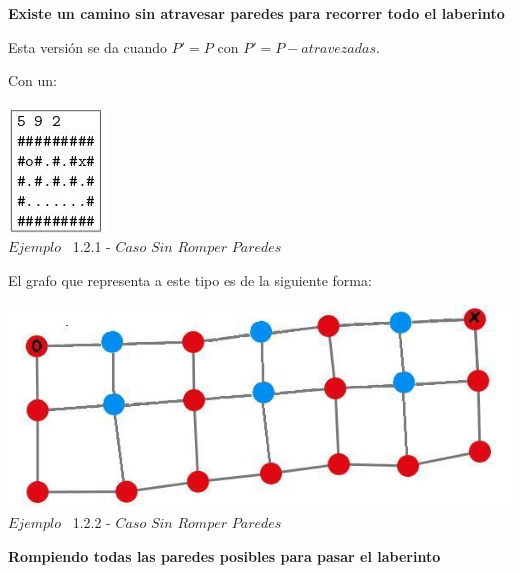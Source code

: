  \begin{center}
 \textbf{Existe un camino sin atravesar paredes para recorrer todo el laberinto}
\end{center}

Esta versi\'on se da cuando $P' = P$ con $P' = P - atravezadas$. 

 Con un:
 
\vspace*{0.3cm} \vspace*{0.3cm}
  \begin{center}
 \includegraphics[scale=0.65]{./EJ1/ej1solucionsinpared.jpeg}
 \\{$Ejemplo$ \ 1.2.1 - $Caso$ $Sin$ $Romper$ $Paredes$}
  \end{center}
  \vspace*{0.3cm}

El grafo que representa a este tipo es de la siguiente forma:\\

\vspace*{0.3cm} \vspace*{0.3cm}
  \begin{center}
 \includegraphics[scale=0.5]{./EJ1/ej1grafosolucionsinpared.jpeg}
 \\{$Ejemplo$ \ 1.2.2 - $Caso$ $Sin$ $Romper$ $Paredes$}
  \end{center}
  \vspace*{0.3cm}

  
\begin{center}
 \textbf{Rompiendo todas las paredes posibles para pasar el laberinto}
\end{center}

